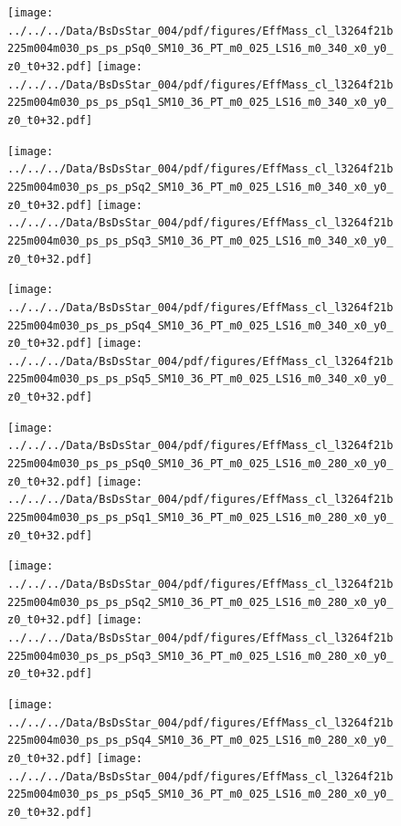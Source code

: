 \documentclass[a4paper,10pt]{article}
\begin{document}
\begin{figure}[p]
 \texttt{[image: ../../../Data/BsDsStar\_004/pdf/figures/EffMass\_cl\_l3264f21b225m004m030\_ps\_ps\_pSq0\_SM10\_36\_PT\_m0\_025\_LS16\_m0\_340\_x0\_y0\_z0\_t0+32.pdf]} 
 \texttt{[image: ../../../Data/BsDsStar\_004/pdf/figures/EffMass\_cl\_l3264f21b225m004m030\_ps\_ps\_pSq1\_SM10\_36\_PT\_m0\_025\_LS16\_m0\_340\_x0\_y0\_z0\_t0+32.pdf]} 
 \end{figure}
\begin{figure}[p]
 \texttt{[image: ../../../Data/BsDsStar\_004/pdf/figures/EffMass\_cl\_l3264f21b225m004m030\_ps\_ps\_pSq2\_SM10\_36\_PT\_m0\_025\_LS16\_m0\_340\_x0\_y0\_z0\_t0+32.pdf]} 
 \texttt{[image: ../../../Data/BsDsStar\_004/pdf/figures/EffMass\_cl\_l3264f21b225m004m030\_ps\_ps\_pSq3\_SM10\_36\_PT\_m0\_025\_LS16\_m0\_340\_x0\_y0\_z0\_t0+32.pdf]} 
 \end{figure}
\begin{figure}[p]
 \texttt{[image: ../../../Data/BsDsStar\_004/pdf/figures/EffMass\_cl\_l3264f21b225m004m030\_ps\_ps\_pSq4\_SM10\_36\_PT\_m0\_025\_LS16\_m0\_340\_x0\_y0\_z0\_t0+32.pdf]} 
 \texttt{[image: ../../../Data/BsDsStar\_004/pdf/figures/EffMass\_cl\_l3264f21b225m004m030\_ps\_ps\_pSq5\_SM10\_36\_PT\_m0\_025\_LS16\_m0\_340\_x0\_y0\_z0\_t0+32.pdf]} 
 \end{figure}
\clearpage
\begin{figure}[p]
 \texttt{[image: ../../../Data/BsDsStar\_004/pdf/figures/EffMass\_cl\_l3264f21b225m004m030\_ps\_ps\_pSq0\_SM10\_36\_PT\_m0\_025\_LS16\_m0\_280\_x0\_y0\_z0\_t0+32.pdf]} 
 \texttt{[image: ../../../Data/BsDsStar\_004/pdf/figures/EffMass\_cl\_l3264f21b225m004m030\_ps\_ps\_pSq1\_SM10\_36\_PT\_m0\_025\_LS16\_m0\_280\_x0\_y0\_z0\_t0+32.pdf]} 
 \end{figure}
\begin{figure}[p]
 \texttt{[image: ../../../Data/BsDsStar\_004/pdf/figures/EffMass\_cl\_l3264f21b225m004m030\_ps\_ps\_pSq2\_SM10\_36\_PT\_m0\_025\_LS16\_m0\_280\_x0\_y0\_z0\_t0+32.pdf]} 
 \texttt{[image: ../../../Data/BsDsStar\_004/pdf/figures/EffMass\_cl\_l3264f21b225m004m030\_ps\_ps\_pSq3\_SM10\_36\_PT\_m0\_025\_LS16\_m0\_280\_x0\_y0\_z0\_t0+32.pdf]} 
 \end{figure}
\begin{figure}[p]
 \texttt{[image: ../../../Data/BsDsStar\_004/pdf/figures/EffMass\_cl\_l3264f21b225m004m030\_ps\_ps\_pSq4\_SM10\_36\_PT\_m0\_025\_LS16\_m0\_280\_x0\_y0\_z0\_t0+32.pdf]} 
 \texttt{[image: ../../../Data/BsDsStar\_004/pdf/figures/EffMass\_cl\_l3264f21b225m004m030\_ps\_ps\_pSq5\_SM10\_36\_PT\_m0\_025\_LS16\_m0\_280\_x0\_y0\_z0\_t0+32.pdf]} 
 \end{figure}
\clearpage
\clearpage
\end{document}
